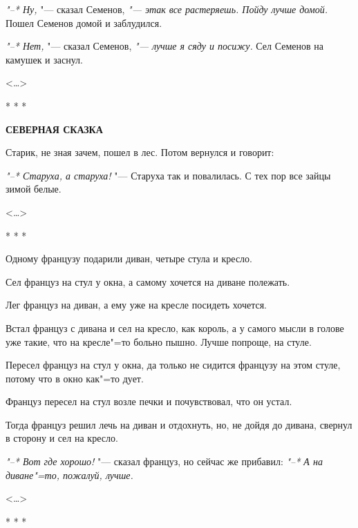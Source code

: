 \documentclass{article}
\begin{document}
\textit{"--* Ну,} "--- сказал Семенов, \textit{"--- этак все растеряешь. Пойду
    лучше домой.} Пошел Семенов домой и заблудился.

\textit{"--* Нет,} "--- сказал Семенов, \textit{"--- лучше я сяду и посижу.} Сел
Семенов на камушек и заснул.

\begin{flushright}<\dots>\end{flushright}

\begin{center}* * *\end{center}

\begin{center} \textbf{СЕВЕРНАЯ СКАЗКА}\end{center}

Старик, не зная зачем, пошел в лес. Потом вернулся и говорит:

\textit{"--* Старуха, а старуха!} "--- Старуха так и повалилась. С тех пор все
зайцы зимой белые.

\begin{flushright}<\dots>\end{flushright}

\begin{center}* * *\end{center}

Одному французу подарили диван, четыре стула и кресло.

Сел француз на стул у окна, а самому хочется на диване полежать.

Лег француз на диван, а ему уже на кресле посидеть хочется.

Встал француз с дивана и сел на кресло, как король, а у самого мысли в голове
уже такие, что на кресле"=то больно пышно. Лучше попроще, на стуле.

Пересел француз на стул у окна, да только не сидится французу на этом стуле,
потому что в окно как"=то дует.

Француз пересел на стул возле печки и почувствовал, что он устал.

Тогда француз решил лечь на диван и отдохнуть, но, не дойдя до дивана, свернул в
сторону и сел на кресло.

\textit{"--* Вот где хорошо!} "--- сказал француз, но сейчас же прибавил:
\textit{"--* А на диване"=то, пожалуй, лучше.}

\begin{flushright}<\dots>\end{flushright}

\begin{center}* * *\end{center}
\end{document}
